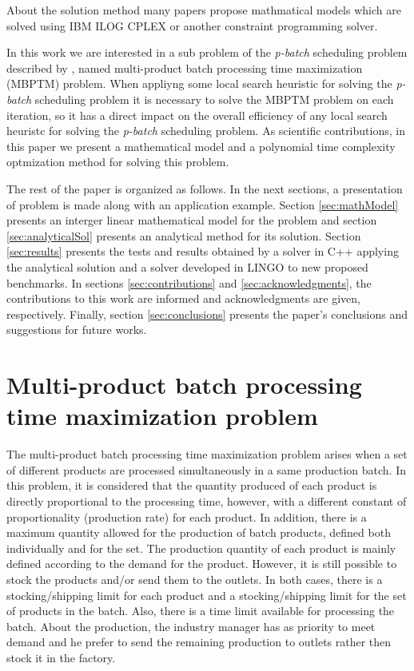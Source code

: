 \documentclass[authoryear,manuscript,12pt]{elsarticle}
\begin{document}
About the solution method many papers propose mathmatical models which are solved using IBM ILOG CPLEX or another constraint programming solver.

In this work we are interested in a sub problem of the \emph{p-batch} scheduling problem described by \cite{KashanOzturk2022}, named multi-product batch processing time maximization (MBPTM) problem. When appliyng some local search heuristic for solving the \emph{p-batch} scheduling problem it is necessary to solve the MBPTM problem on each iteration, so it has a direct impact on the overall efficiency of any local search heuristc for solving the \emph{p-batch} scheduling problem. As scientific contributions, in this paper we present a mathematical model and a polynomial time complexity optmization method for solving this problem.

The rest of the paper is organized as follows. In the next sections, a presentation of problem is made along with an application example. Section \ref{sec:mathModel} presents an interger linear mathematical model for the problem and section \ref{sec:analyticalSol} presents an analytical method for its solution. Section \ref{sec:results} presents the tests and results obtained by a solver in C++ applying the analytical solution and a solver developed in LINGO to new proposed benchmarks. In sections \ref{sec:contributions} and \ref{sec:acknowledgments}, the contributions to this work are informed and acknowledgments are given, respectively. Finally, section \ref{sec:conclusions} presents the paper's conclusions and suggestions for future works.

\section{Multi-product batch processing time maximization problem}
\label{sec:MBPTMP}

The multi-product batch processing time maximization problem arises when a set of different products are processed simultaneously in a same production batch. In this problem, it is considered that the quantity produced of each product is directly proportional to the processing time, however, with a different constant of proportionality (production rate) for each product. In addition, there is a maximum quantity allowed for the production of batch products, defined both individually and for the set. The production quantity of each product is mainly defined according to the demand for the product. However, it is still possible to stock the products and/or send them to the outlets. In both cases, there is a stocking/shipping limit for each product and a stocking/shipping limit for the set of products in the batch. Also, there is a time limit available for processing the batch. About the production, the industry manager has as priority to meet demand and he prefer to send the remaining production to outlets rather then stock it in the factory. 
\end{document}
